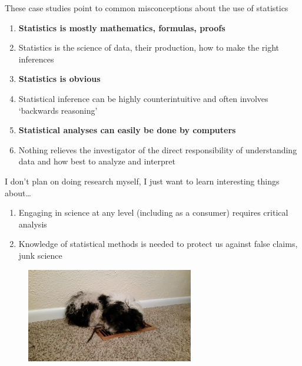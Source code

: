 \documentclass[aspectratio=1610,pdftex,dvipsnames,compress,xcolor={dvipsnames}]{beamer}
\begin{document}
\addtocounter{framenumber}{-1}
\begin{frame}{These case studies point to common misconceptions about the use of statistics}
    \begin{enumerate}[series=outerlist,topsep=0pt,itemsep=3pt,leftmargin=*,label=(\arabic*)]
        \item[]\textbf{Statistics is mostly mathematics, formulas, proofs}
        \item[]Statistics is the science of data, their production, how to make the right inferences
            \vspace{0.25in}
        \item[]\textbf{Statistics is obvious}
        \item[]Statistical inference can be highly counterintuitive and often involves `backwards reasoning'
            \vspace{0.25in}
        \item[]\textbf{Statistical analyses can easily be done by computers}
        \item[]Nothing relieves the investigator of the direct responsibility of understanding data and how best to analyze and interpret
    \end{enumerate}
\end{frame}


\begin{frame}{I don’t plan on doing research myself, I just want to learn interesting things about\ldots}
    \begin{enumerate}[series=outerlist,topsep=0pt,itemsep=21pt,leftmargin=*,label=(\arabic*)]
        \item[]Engaging in science at any level (including as a consumer) requires critical analysis
        \item[]Knowledge of statistical methods is needed to protect us against false claims, junk science
    \end{enumerate}
\end{frame}


\begin{frame}[plain]{}
    \begin{figure}
        \centering
        \includegraphics[width=0.65\textwidth]{final.jpg}
    \end{figure}
\end{frame}
\end{document}

